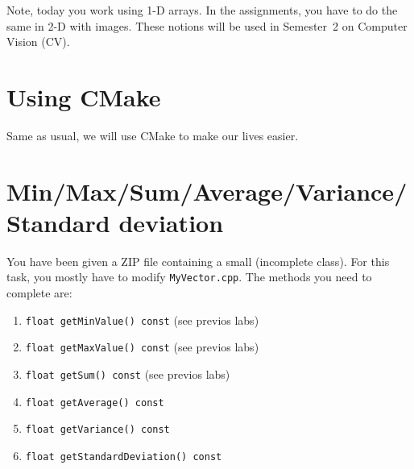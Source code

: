 \documentclass[english,a4paper,12pt,oneside]{article}
\begin{document}
Note, today you work using 1-D arrays. In the assignments, you have to do the same in 2-D with images. 
These notions will be used in Semester~2 on Computer Vision (CV). 

\section{Using CMake}

Same as usual, we will use CMake to make our lives easier. 

\section{Min/Max/Sum/Average/Variance/Standard deviation}

You have been given a ZIP file containing a small (incomplete class). 
For this task, you mostly have to modify \verb+MyVector.cpp+.
The methods you need to complete are:
\begin{enumerate}
 \item \verb+float getMinValue() const+ (see previos labs)
 \item \verb+float getMaxValue() const+ (see previos labs)
 \item \verb+float getSum() const+ (see previos labs)
 \item \verb+float getAverage() const+
 \item \verb+float getVariance() const+
 \item \verb+float getStandardDeviation() const+
\end{enumerate}
\end{document}
